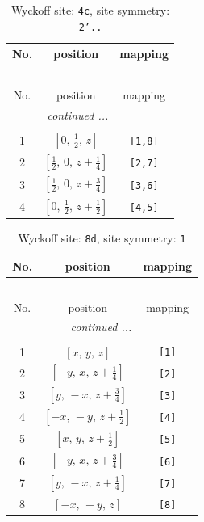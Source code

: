 \documentclass[fleqn,8pt]{jsarticle}
\begin{document}
\renewcommand{\arraystretch}{1.2}
\begin{longtable}{ccc}
\caption{Wyckoff site: {\tt 4c}, site symmetry: {\tt 2'..}}
 \\
 \hline \hline
No. & position & mapping \\ \hline \endfirsthead

\multicolumn{2}{l}{\tablename\ \thetable{}} \\
 \hline \hline
No. & position & mapping \\ \hline \endhead

 \hline \hline
\multicolumn{2}{r}{\footnotesize\it continued ...} \\ \endfoot

 \hline \hline
\multicolumn{2}{r}{} \\ \endlastfoot

1 & $\left[ 0,\, \frac{1}{2},\, z \right]$ & {\tt [1,8]} \\ \hline
2 & $\left[ \frac{1}{2},\, 0,\, z + \frac{1}{4} \right]$ & {\tt [2,7]} \\ \hline
3 & $\left[ \frac{1}{2},\, 0,\, z + \frac{3}{4} \right]$ & {\tt [3,6]} \\ \hline
4 & $\left[ 0,\, \frac{1}{2},\, z + \frac{1}{2} \right]$ & {\tt [4,5]} \\
\end{longtable}
\renewcommand{\arraystretch}{1.2}
\begin{longtable}{ccc}
\caption{Wyckoff site: {\tt 8d}, site symmetry: {\tt 1}}
 \\
 \hline \hline
No. & position & mapping \\ \hline \endfirsthead

\multicolumn{2}{l}{\tablename\ \thetable{}} \\
 \hline \hline
No. & position & mapping \\ \hline \endhead

 \hline \hline
\multicolumn{2}{r}{\footnotesize\it continued ...} \\ \endfoot

 \hline \hline
\multicolumn{2}{r}{} \\ \endlastfoot

1 & $\left[ x,\, y,\, z \right]$ & {\tt [1]} \\ \hline
2 & $\left[ - y,\, x,\, z + \frac{1}{4} \right]$ & {\tt [2]} \\ \hline
3 & $\left[ y,\, - x,\, z + \frac{3}{4} \right]$ & {\tt [3]} \\ \hline
4 & $\left[ - x,\, - y,\, z + \frac{1}{2} \right]$ & {\tt [4]} \\ \hline
5 & $\left[ x,\, y,\, z + \frac{1}{2} \right]$ & {\tt [5]} \\ \hline
6 & $\left[ - y,\, x,\, z + \frac{3}{4} \right]$ & {\tt [6]} \\ \hline
7 & $\left[ y,\, - x,\, z + \frac{1}{4} \right]$ & {\tt [7]} \\ \hline
8 & $\left[ - x,\, - y,\, z \right]$ & {\tt [8]} \\
\end{longtable}
\end{document}
